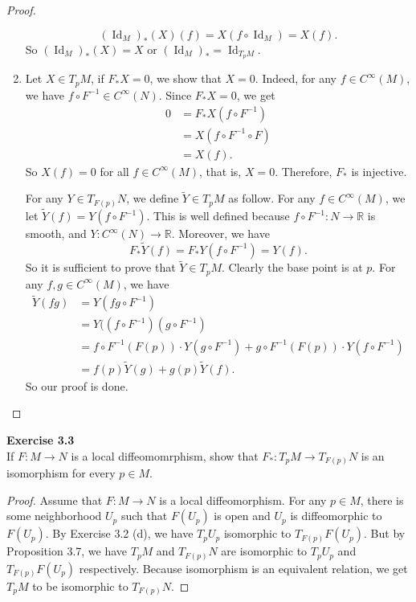 \documentclass[12pt, a4paper]{article}
\theoremstyle{plain}
\newcommand{\R}{\mathbb{R}}
\DeclareMathOperator{\Id}{Id}
\def\tilde{\widetilde}
\newenvironment{exercise}[2][Exercise]
    { \begin{mdframed}[backgroundcolor=gray!20] \textbf{#1 #2} \\}
    {  \end{mdframed}}
\begin{document}
\begin{proof}
\begin{enumerate}[label=(\alph*)]
            \[
            (\Id_M)_*(X)(f)=X(f\circ\Id_M)=X(f). 
            \]
            So $(\Id_M)_*(X)=X$ or $(\Id_M)_*=\Id_{T_pM}$.
            \item Let $X\in T_pM$, if $F_*X=0$, we show that $X=0$. Indeed, for any $f\in C^\infty(M)$, we have $f\circ F^{-1}\in C^\infty(N)$. Since $F_*X=0$, we get
            \begin{align*}
                0 &= F_*X(f\circ F^{-1})\\
                &=X(f\circ F^{-1}\circ F)\\
                &= X(f).
            \end{align*}
            So $X(f)=0$ for all $f\in C^\infty(M)$, that is, $X=0$. Therefore, $F_*$ is injective.

            For any $Y\in T_{F(p)}N$, we define $\tilde Y\in T_pM$ as follow. For any $f\in C^\infty(M)$, we let $\tilde Y(f)=Y(f\circ F^{-1})$. This is well defined because $f\circ F^{-1}\colon N\to \R$ is smooth, and $Y\colon C^\infty(N)\to \R$. Moreover, we have
            \[
            F_*\tilde Y(f) = F_*Y(f\circ F^{-1})=Y(f).
            \]
            So it is sufficient to prove that $\tilde Y\in T_pM$. Clearly the base point is at $p$. For any $f,g\in C^\infty(M)$, we have
            \begin{align*}
                \tilde Y(fg)&= Y(fg\circ F^{-1})\\
                &=Y((f\circ F^{-1})(g\circ F^{-1})\\
                &=f\circ F^{-1}(F(p))\cdot Y(g\circ F^{-1})+g\circ F^{-1}(F(p))\cdot Y(f\circ F^{-1})\\
                &=f(p)\tilde Y(g)+g(p)\tilde Y(f).
            \end{align*}
            So our proof is done.
        \end{enumerate}
    \end{proof}

\begin{exercise}{3.3}
    If $F\colon M\to N$ is a local diffeomomrphism, show that $F_*\colon T_pM\to T_{F(p)}N$ is an isomorphism for every $p\in M$.
\end{exercise}
    \begin{proof}
        Assume that $F\colon M\to N$ is a local diffeomorphism. For any $p\in M$, there is some neighborhood $U_p$ such that $F(U_p)$ is open and $U_p$ is diffeomorphic to $F(U_p)$. By Exercise 3.2 (d), we have $T_pU_p$ isomorphic to $T_{F(p)}F(U_p)$. But by Proposition 3.7, we have $T_pM$ and $T_{F(p)}N$ are isomorphic to $T_pU_p$ and $T_{F(p)}F(U_p)$ respectively. Because isomorphism is an equivalent relation, we get $T_pM$ to be isomorphic to $T_{F(p)}N$.
    \end{proof}
\end{document}
